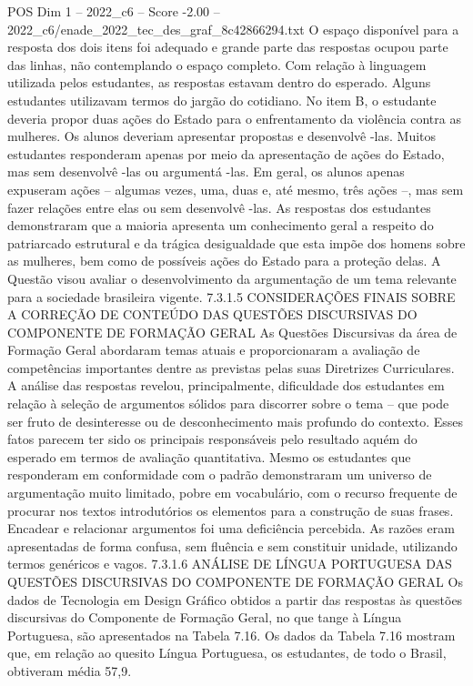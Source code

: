 \begin{textsample}{POS Dim 1 – 2022\_c6 – Score -2.00 – 2022\_c6/enade\_2022\_tec\_des\_graf\_8c42866294.txt}
O espaço disponível para a resposta dos dois itens foi adequado e grande parte das respostas ocupou parte das linhas, não contemplando o espaço completo.
Com relação à linguagem utilizada pelos estudantes, as respostas estavam dentro do esperado.
Alguns estudantes utilizavam termos do jargão do cotidiano.
No item B, o estudante deveria propor duas ações do Estado para o enfrentamento da violência contra as mulheres.
Os alunos deveriam apresentar propostas e desenvolvê -las.
Muitos estudantes responderam apenas por meio da apresentação de ações do Estado, mas sem desenvolvê -las ou argumentá -las.
Em geral, os alunos apenas expuseram ações – algumas vezes, uma, duas e, até mesmo, três ações –, mas sem fazer relações entre elas ou sem desenvolvê -las.
As respostas dos estudantes demonstraram que a maioria apresenta um conhecimento geral a respeito do patriarcado estrutural e da trágica desigualdade que esta impõe dos homens sobre as mulheres, bem como de possíveis ações do Estado para a proteção delas.
A Questão visou avaliar o desenvolvimento da argumentação de um tema relevante para a sociedade brasileira vigente. 7.3.1.5 CONSIDERAÇÕES FINAIS SOBRE A CORREÇÃO DE CONTEÚDO DAS QUESTÕES DISCURSIVAS DO COMPONENTE DE FORMAÇÃO GERAL As Questões Discursivas da área de Formação Geral abordaram temas atuais e proporcionaram a avaliação de competências importantes dentre as previstas pelas suas Diretrizes Curriculares.
A análise das respostas revelou, principalmente, dificuldade dos estudantes em relação à seleção de argumentos sólidos para discorrer sobre o tema – que pode ser fruto de desinteresse ou de desconhecimento mais profundo do contexto.
Esses fatos parecem ter sido os principais responsáveis pelo resultado aquém do esperado em termos de avaliação quantitativa.
Mesmo os estudantes que responderam em conformidade com o padrão demonstraram um universo de argumentação muito limitado, pobre em vocabulário, com o recurso frequente de procurar nos textos introdutórios os elementos para a construção de suas frases.
Encadear e relacionar argumentos foi uma deficiência percebida.
As razões eram apresentadas de forma confusa, sem fluência e sem constituir unidade, utilizando termos genéricos e vagos. 7.3.1.6 ANÁLISE DE LÍNGUA PORTUGUESA DAS QUESTÕES DISCURSIVAS DO COMPONENTE DE FORMAÇÃO GERAL Os dados de Tecnologia em Design Gráfico obtidos a partir das respostas às questões discursivas do Componente de Formação Geral, no que tange à Língua Portuguesa, são apresentados na Tabela 7.16.
Os dados da Tabela 7.16 mostram que, em relação ao quesito Língua Portuguesa, os estudantes, de todo o Brasil, obtiveram média 57,9.

\end{textsample}
